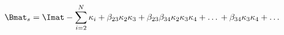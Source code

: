 \begin{equation}
\Bmat_s = \Imat - \sum\limits^{N}_{i=2} \kappa_i + \beta_{23} \kappa_2 \kappa_3 + \beta_{23}\beta_{34} \kappa_2 \kappa_3 \kappa_4+\ldots \\
+\beta_{34} \kappa_3\kappa_4 +\ldots
\end{equation}
  